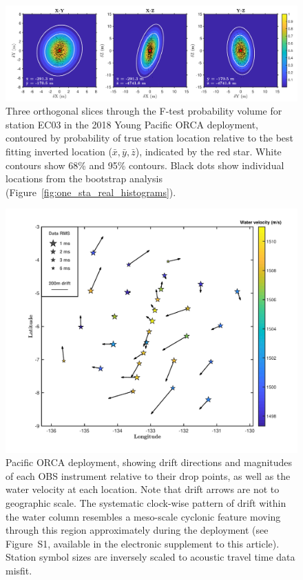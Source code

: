 \newpage

\begin{figure}[h]
\includegraphics[trim=0cm 0cm 0cm 0cm,clip=true,width=\columnwidth]{Figure04.pdf}
\caption{ Three orthogonal slices through the F-test probability volume for station EC03 in the 2018 Young Pacific ORCA deployment, contoured by probability of true station location relative to the best fitting inverted location ($\bar{x},\bar{y},\bar{z}$), indicated by the red star. White contours show 68\% and 95\% contours. Black dots show individual locations from the bootstrap analysis (Figure~\ref{fig:one_sta_real_histograms}).}
\label{fig:one_sta_real_ftests}
\end{figure}

\newpage

\begin{figure}[h]
\includegraphics[trim=0cm 0cm 0cm 0cm,clip=true,width=\columnwidth]{Figure08.pdf}
\caption{Pacific ORCA deployment, showing drift directions and magnitudes of each OBS instrument relative to their drop points, as well as the water velocity at each location. Note that drift arrows are not to geographic scale. The systematic clock-wise pattern of drift within the water column resembles a meso-scale cyclonic feature moving through this region approximately during the deployment (see Figure~S1, available in the electronic supplement to this article). Station symbol sizes are inversely scaled to acoustic travel time data misfit.}
\label{fig:meso_eddy}
\end{figure}